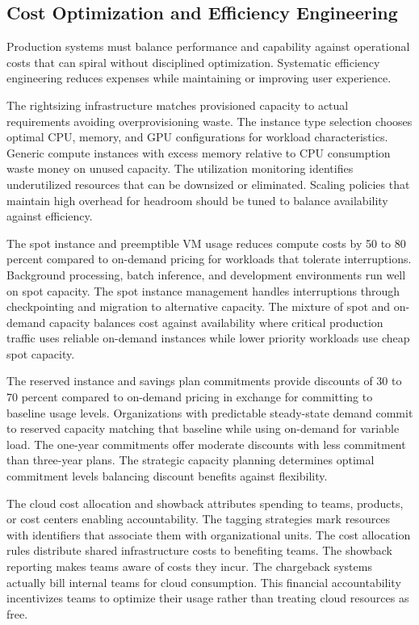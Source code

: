\subsection{Cost Optimization and Efficiency Engineering}

Production systems must balance performance and capability against operational costs that can spiral without disciplined optimization. Systematic efficiency engineering reduces expenses while maintaining or improving user experience.

The rightsizing infrastructure matches provisioned capacity to actual requirements avoiding overprovisioning waste. The instance type selection chooses optimal CPU, memory, and GPU configurations for workload characteristics. Generic compute instances with excess memory relative to CPU consumption waste money on unused capacity. The utilization monitoring identifies underutilized resources that can be downsized or eliminated. Scaling policies that maintain high overhead for headroom should be tuned to balance availability against efficiency.

The spot instance and preemptible VM usage reduces compute costs by 50 to 80 percent compared to on-demand pricing for workloads that tolerate interruptions. Background processing, batch inference, and development environments run well on spot capacity. The spot instance management handles interruptions through checkpointing and migration to alternative capacity. The mixture of spot and on-demand capacity balances cost against availability where critical production traffic uses reliable on-demand instances while lower priority workloads use cheap spot capacity.

The reserved instance and savings plan commitments provide discounts of 30 to 70 percent compared to on-demand pricing in exchange for committing to baseline usage levels. Organizations with predictable steady-state demand commit to reserved capacity matching that baseline while using on-demand for variable load. The one-year commitments offer moderate discounts with less commitment than three-year plans. The strategic capacity planning determines optimal commitment levels balancing discount benefits against flexibility.

The cloud cost allocation and showback attributes spending to teams, products, or cost centers enabling accountability. The tagging strategies mark resources with identifiers that associate them with organizational units. The cost allocation rules distribute shared infrastructure costs to benefiting teams. The showback reporting makes teams aware of costs they incur. The chargeback systems actually bill internal teams for cloud consumption. This financial accountability incentivizes teams to optimize their usage rather than treating cloud resources as free.

